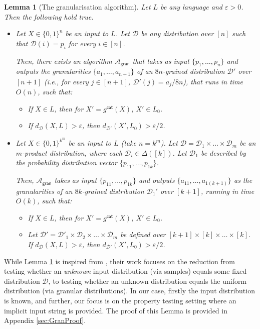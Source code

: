 \documentclass[11pt]{article}
\newtheorem{lemma}[theorem]{Lemma}
\newcommand{\gran}{\mathsf{gran}}
\newcommand{\sD}{\mathcal{D}}
\newcommand{\sA}{\mathcal{A}}
\begin{document}
\begin{lemma}[The granularisation algorithm]
\label{lem:make_granular}
Let $L$ be any language and $\varepsilon > 0$. Then the following hold true.
\begin{itemize}
    \item Let $X \in \{0,1\}^n$ be an input to $L$. Let $\sD$ be any distribution over $[n]$ such that $\sD(i) = p_i$ for every $i \in [n]$.
    
    Then, there exists an algorithm $\sA_{\gran}$ that takes as input $\{p_1, \dots, p_n\}$ and outputs the granularities $\{a_1, \dots, a_{n+1}\}$ of an $8n$-grained distribution $\sD'$ over $[n+1]$ (i.e., for every $j \in [n+1]$, $\sD'(j) = a_j/8n$), that runs in time $O(n)$, such that:
    \begin{itemize}
        \item If $X \in L$, then for $X' = g^{\mathsf{cat}}(X)$, $X' \in L_0$.
        \item If $d_\sD (X,L) > \varepsilon$, then $d_{\sD'} (X',L_0) > \varepsilon/2$.
    \end{itemize}
    
    \item Let $X \in \{0,1\}^{k^m}$ be an input to $L$ (take $n = k^m$). Let $\sD = \sD_1 \times \dots \times \sD_m$ be an $m$-product distribution, where each $\sD_i \in \Delta([k])$. Let $\sD_1$ be described by the probability distribution vector $\{p_{11}, \dots, p_{1k}\}$. 
    
    Then, $\sA_{\gran}$ takes as input $\{p_{11}, \dots, p_{1k}\}$ and outputs $\{a_{11}, \dots, a_{1(k+1)}\}$ as the granularities of an $8k$-grained distribution $\sD_1'$ over $[k+1]$, running in time $O(k)$, such that:
    \begin{itemize}
        \item If $X \in L$, then for $X' = g^{\mathsf{cat}}(X)$, $X' \in L_0$.
        \item Let $\sD' = \sD'_1 \times \sD_2 \times \dots \times \sD_m$ be defined over $[k+1] \times [k] \times \dots \times [k]$. If $d_\sD (X,L) > \varepsilon$, then $d_{\sD'} (X',L_0) > \varepsilon/2$.
    \end{itemize}
\end{itemize}
\end{lemma}
While Lemma \ref{lem:make_granular} is inspired from \cite{Gol20}, their work focuses on the reduction from testing whether an \textit{unknown} input distribution (via samples) equals some fixed distribution $\sD$, to testing whether an unknown distribution equals the uniform distribution (via granular distributions). In our case, firstly the input distribution is known, and further, our focus is on the property testing setting where an implicit input string is provided. The proof of this Lemma is provided in Appendix \ref{sec:GranProof}.
\end{document}
